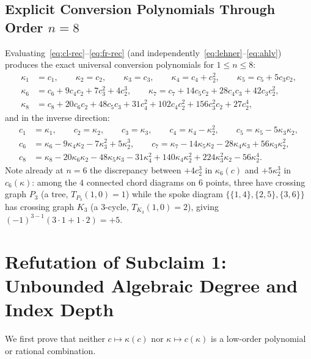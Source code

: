 \documentclass[11pt,a4paper]{article}
\theoremstyle{definition}
\theoremstyle{remark}
\begin{document}
\subsection{Explicit Conversion Polynomials Through Order \texorpdfstring{$n = 8$}{n = 8}}

Evaluating~\eqref{eq:cl-rec}--\eqref{eq:fr-rec} (and independently~\eqref{eq:lehner}--\eqref{eq:ahlv}) produces the exact universal conversion polynomials for $1 \le n \le 8$:
\begin{align*}
  \kappa_1 &= c_1, \qquad \kappa_2 = c_2, \qquad \kappa_3 = c_3, \qquad \kappa_4 = c_4 + c_2^2, \qquad \kappa_5 = c_5 + 5 c_3 c_2,\\
  \kappa_6 &= c_6 + 9 c_4 c_2 + 7 c_3^2 + 4 c_2^3, \qquad
  \kappa_7 = c_7 + 14 c_5 c_2 + 28 c_4 c_3 + 42 c_3 c_2^2,\\
  \kappa_8 &= c_8 + 20 c_6 c_2 + 48 c_5 c_3 + 31 c_4^2 + 102 c_4 c_2^2 + 156 c_3^2 c_2 + 27 c_2^4,
\end{align*}
and in the inverse direction:
\begin{align*}
  c_1 &= \kappa_1, \qquad c_2 = \kappa_2, \qquad c_3 = \kappa_3, \qquad c_4 = \kappa_4 - \kappa_2^2, \qquad c_5 = \kappa_5 - 5 \kappa_3 \kappa_2,\\
  c_6 &= \kappa_6 - 9 \kappa_4 \kappa_2 - 7 \kappa_3^2 + 5 \kappa_2^3, \qquad
  c_7 = \kappa_7 - 14 \kappa_5 \kappa_2 - 28 \kappa_4 \kappa_3 + 56 \kappa_3 \kappa_2^2,\\
  c_8 &= \kappa_8 - 20 \kappa_6 \kappa_2 - 48 \kappa_5 \kappa_3 - 31 \kappa_4^2 + 140 \kappa_4 \kappa_2^2 + 224 \kappa_3^2 \kappa_2 - 56 \kappa_2^4.
\end{align*}
Note already at $n = 6$ the discrepancy between $+4 c_2^3$ in $\kappa_6(c)$ and $+5 \kappa_2^3$ in $c_6(\kappa)$: among the $4$ connected chord diagrams on $6$ points, three have crossing graph $P_3$ (a tree, $T_{P_3}(1,0) = 1$) while the spoke diagram $\{\{1,4\},\{2,5\},\{3,6\}\}$ has crossing graph $K_3$ (a $3$-cycle, $T_{K_3}(1,0) = 2$), giving $(-1)^{3-1}(3\cdot 1 + 1\cdot 2) = +5$.

\section{Refutation of Subclaim 1: Unbounded Algebraic Degree and Index Depth}\label{sec:degree}

We first prove that neither $c \mapsto \kappa(c)$ nor $\kappa \mapsto c(\kappa)$ is a low-order polynomial or rational combination.
\end{document}
